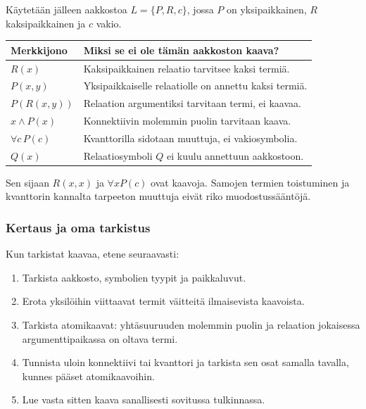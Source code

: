 \documentclass[11pt,a4paper]{amsart}
\begin{document}
\begin{example}
  Käytetään jälleen aakkostoa $L=\{P,R,c\}$, jossa $P$ on
  yksipaikkainen, $R$ kaksipaikkainen ja $c$ vakio.
  \begin{center}
    \renewcommand{\arraystretch}{1.25}
    \begin{tabular}{lp{}}
      \hline
      Merkkijono & Miksi se ei ole tämän aakkoston kaava?\\
      \hline
      $R(x)$ & Kaksipaikkainen relaatio tarvitsee kaksi termiä.\\
      $P(x,y)$ & Yksipaikkaiselle relaatiolle on annettu kaksi termiä.\\
      $P(R(x,y))$ & Relaation argumentiksi tarvitaan termi, ei kaavaa.\\
      $x\land P(x)$ & Konnektiivin molemmin puolin tarvitaan kaava.\\
      $\forall c\,P(c)$ & Kvanttorilla sidotaan muuttuja, ei vakiosymbolia.\\
      $Q(x)$ & Relaatiosymboli $Q$ ei kuulu annettuun aakkostoon.\\
      \hline
    \end{tabular}
  \end{center}
  Sen sijaan $R(x,x)$ ja $\forall x P(c)$ ovat kaavoja.
  Samojen termien toistuminen ja kvanttorin kannalta tarpeeton muuttuja
  eivät riko muodostussääntöjä.
\end{example}

\subsubsection{Kertaus ja oma tarkistus}

Kun tarkistat kaavaa, etene seuraavasti:
\begin{enumerate}
  \item Tarkista aakkosto, symbolien tyypit ja paikkaluvut.
  \item Erota yksilöihin viittaavat termit väitteitä ilmaisevista kaavoista.
  \item Tarkista atomikaavat: yhtäsuuruuden molemmin puolin ja
    relaation jokaisessa argumenttipaikassa on oltava termi.
  \item Tunnista uloin konnektiivi tai kvanttori ja tarkista sen osat
    samalla tavalla, kunnes pääset atomikaavoihin.
  \item Lue vasta sitten kaava sanallisesti sovitussa tulkinnassa.
\end{enumerate}
\end{document}
